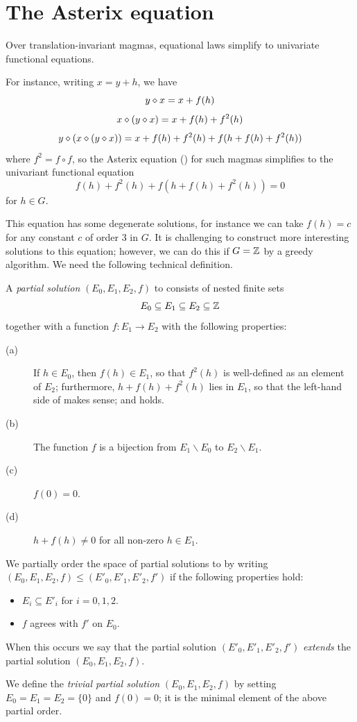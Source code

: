 \section{The Asterix equation}\label{asterix-section}

Over translation-invariant magmas, equational laws simplify to univariate functional equations.

For instance, writing $x = y+h$, we have
$$ y \diamond x = x + f(h)$$
$$ x \diamond (y \diamond x) = x + f(h) + f^2(h)$$
$$ y \diamond (x \diamond (y \diamond x)) = x + f(h) + f^2(h) + f( h + f(h) + f^2(h) )$$
where $f^2 = f \circ f$, so the Asterix equation () for such magmas simplifies to the univariant functional equation
\begin{equation}\label{fh}
   f(h) + f^2(h) + f( h + f(h) + f^2(h) ) = 0
\end{equation}
for $h \in G$.

This equation has some degenerate solutions, for instance we can take $f(h) = c$ for any constant $c$ of order $3$ in $G$.  It is challenging to construct more interesting solutions to this equation; however, we can do this if $G=\mathbb{Z}$ by a greedy algorithm.  We need the following technical definition.

\begin{definition}\label{partial-solution}  A \emph{partial solution} $(E_0, E_1, E_2, f)$ to  consists of nested finite sets
$$ E_0 \subseteq E_1 \subseteq E_2 \subseteq \mathbb{Z}$$ together with a function $f: E_1 \to E_2$ with the following properties:
\begin{description}
  \item[(a)] If $h \in E_0$, then $f(h) \in E_1$, so that $f^2(h)$ is well-defined as an element of $E_2$; furthermore, $h + f(h) + f^2(h)$ lies in $E_1$, so that the left-hand side of  makes sense; and  holds.
  \item[(b)] The function $f$ is a bijection from $E_1 \backslash E_0$ to $E_2 \backslash E_1$.
  \item[(c)] $f(0)=0$.
  \item[(d)] $h+f(h) \neq 0$ for all non-zero $h \in E_1$.
\end{description}

We partially order the space of partial solutions to  by writing $(E_0, E_1, E_2, f) \leq (E'_0, E'_1, E'_2, f')$ if the following properties hold:
\begin{itemize}
  \item $E_i \subseteq E'_i$ for $i=0,1,2$.
  \item $f$ agrees with $f'$ on $E_0$.
\end{itemize}
When this occurs we say that the partial solution $(E'_0, E'_1, E'_2, f')$ \emph{extends} the partial solution $(E_0, E_1, E_2, f)$.

We define the \emph{trivial partial solution} $(E_0,E_1,E_2,f)$ by setting $E_0=E_1=E_2=\{0\}$ and $f(0)=0$; it is the minimal element of the above partial order.
\end{definition}


